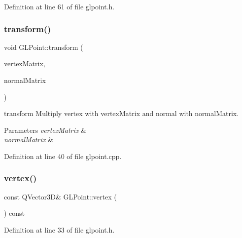 Definition at line 61 of file glpoint.\+h.

\mbox{\label{class_g_l_point_a1e65d4eb8478a28ea1ebe6bd98e26837}} 
\subsubsection{\texorpdfstring{transform()}{transform()}}
{\footnotesize\ttfamily void G\+L\+Point\+::transform (\begin{DoxyParamCaption}\item[{const Q\+Matrix4x4 \&}]{vertex\+Matrix,  }\item[{const Q\+Matrix4x4 \&}]{normal\+Matrix }\end{DoxyParamCaption})}



transform Multiply vertex with vertex\+Matrix and normal with normal\+Matrix. 


\begin{DoxyParams}{Parameters}
{\em vertex\+Matrix} & \\
\hline
{\em normal\+Matrix} & \\
\hline
\end{DoxyParams}


Definition at line 40 of file glpoint.\+cpp.

\mbox{\label{class_g_l_point_a4766a3f463b4e46cd3af53a6d17cdd69}} 
\subsubsection{\texorpdfstring{vertex()}{vertex()}}
{\footnotesize\ttfamily const Q\+Vector3D\& G\+L\+Point\+::vertex (\begin{DoxyParamCaption}{ }\end{DoxyParamCaption}) const\hspace{0.3cm}{\ttfamily [inline]}}



Definition at line 33 of file glpoint.\+h.

\mbox{\label{class_g_l_point_ac45fdd4dc914c102ab013eb4d984f994}} 
